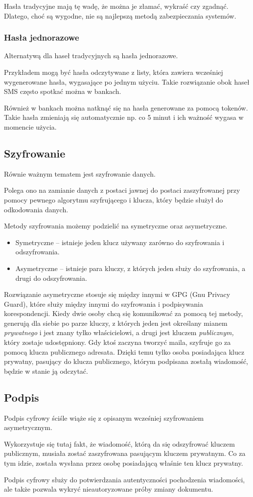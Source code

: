 Hasła tradycyjne mają tę wadę, że można je złamać, wykraść czy zgadnąć.
Dlatego, choć są wygodne, nie są najlepszą metodą zabezpieczania systemów.

\subsubsection{Hasła jednorazowe}
Alternatywą dla haseł tradycyjnych są hasła jednorazowe.

Przykładem mogą być hasła odczytywane z listy, która zawiera wcześniej wygenerowane hasła, wygasające po jednym użyciu.
Takie rozwiązanie obok haseł SMS często spotkać można w bankach.

Również w bankach można natknąć się na hasła generowane za pomocą tokenów.
Takie hasła zmieniają się automatycznie np. co 5 minut i ich ważność wygasa w momencie użycia.

\subsection{Szyfrowanie}
Równie ważnym tematem jest szyfrowanie danych.

Polega ono na zamianie danych z postaci jawnej do postaci zaszyfrowanej przy pomocy pewnego algorytmu szyfrującego i klucza, który będzie służył do odkodowania danych.

Metody szyfrowania możemy podzielić na symetryczne oraz asymetryczne.

\begin{itemize}
	\item{Symetryczne -- istnieje jeden klucz używany zarówno do szyfrowania i odszyfrowania.}
	\item{Asymetryczne -- istnieje para kluczy, z których jeden służy do szyfrowania, a drugi do odszyfrowania.}
\end{itemize}

Rozwiązanie asymetryczne stosuje się między innymi w GPG (Gnu Privacy Guard), które służy między innymi do szyfrowania i podpisywania korespondencji.
Kiedy dwie osoby chcą się komunikować za pomocą tej metody, generują dla siebie po parze kluczy, z których jeden jest określany mianem \textit{prywatnego} i jest znany tylko właścicielowi, a drugi jest kluczem \textit{publicznym,} który zostaje udostępniony.
Gdy ktoś zaczyna tworzyć maila, szyfruje go za pomocą klucza publicznego adresata.
Dzięki temu tylko osoba posiadająca klucz prywatny, pasujący do klucza publicznego, którym podpisana zostałą wiadomość, będzie w stanie ją  odczytać.

\subsection{Podpis}
Podpis cyfrowy ściśle wiąże się z opisanym wcześniej szyfrowaniem asymetrycznym.

Wykorzystuje się tutaj fakt, że wiadomość, którą da się odszyfrować kluczem publicznym, musiała zostać zaszyfrowana pasującym kluczem prywatnym. Co za tym idzie, została wysłana przez osobę posiadającą właśnie ten klucz prywatny.

Podpis cyfrowy służy do potwierdzania autentyczności pochodzenia wiadomości, ale także pozwala wykryć nieautoryzowane próby zmiany dokumentu.